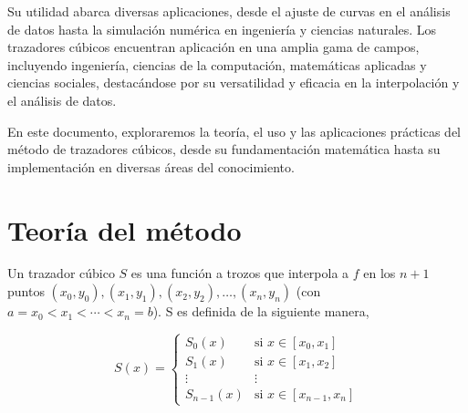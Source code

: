 \documentclass[conference]{IEEEtran}
\begin{document}
Su utilidad abarca diversas aplicaciones, desde el ajuste de curvas
en el análisis de datos hasta la simulación numérica en ingeniería y ciencias
naturales. Los trazadores cúbicos encuentran aplicación en una amplia gama de
campos, incluyendo ingeniería, ciencias de la computación, matemáticas
aplicadas y ciencias sociales, destacándose por su versatilidad y eficacia
en la interpolación y el análisis de datos.

En este documento, exploraremos la teoría, el uso y las aplicaciones 
prácticas del método de trazadores cúbicos, desde su fundamentación 
matemática hasta su implementación en diversas áreas del conocimiento.

\section{Teoría del método}

Un trazador cúbico $S$ es una función a trozos que interpola a $f$ en los
$n + 1$ puntos $(x_0, y_0), (x_1, y_1), (x_2, y_2), \dots, (x_n, y_n)$
(con $a = x_0 < x_1 < \cdots < x_n = b$). S es definida de la siguiente manera,

\[
	S(x) =
	\begin{cases}
		S_{0}(x)     & \text{si } x \in [x_{0}, x_{1}]     \\
		S_{1}(x)     & \text{si } x \in [x_{1}, x_{2}]     \\
		\vdots       & \vdots                              \\
		S_{n - 1}(x) & \text{si } x \in [x_{n - 1}, x_{n}]
	\end{cases}
\]


\end{document}
